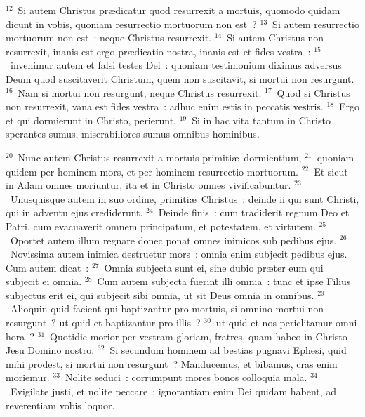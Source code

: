 ${}^{12}$~Si autem Christus pr\ae dicatur quod resurrexit a mortuis, quomodo quidam dicunt in vobis, quoniam resurrectio mortuorum non est~?
${}^{13}$~Si autem resurrectio mortuorum non est~: neque Christus resurrexit.
${}^{14}$~Si autem Christus non resurrexit, inanis est ergo pr\ae dicatio nostra, inanis est et fides vestra~:
${}^{15}$~invenimur autem et falsi testes Dei~: quoniam testimonium diximus adversus Deum quod suscitaverit Christum, quem non suscitavit, si mortui non resurgunt.
${}^{16}$~Nam si mortui non resurgunt, neque Christus resurrexit.
${}^{17}$~Quod si Christus non resurrexit, vana est fides vestra~: adhuc enim estis in peccatis vestris.
${}^{18}$~Ergo et qui dormierunt in Christo, perierunt.
${}^{19}$~Si in hac vita tantum in Christo sperantes sumus, miserabiliores sumus omnibus hominibus.


${}^{20}$~Nunc autem Christus resurrexit a mortuis primiti\ae\ dormientium,
${}^{21}$~quoniam quidem per hominem mors, et per hominem resurrectio mortuorum.
${}^{22}$~Et sicut in Adam omnes moriuntur, ita et in Christo omnes vivificabuntur.
${}^{23}$~Unusquisque autem in suo ordine, primiti\ae\ Christus~: deinde ii qui sunt Christi, qui in adventu ejus crediderunt.
${}^{24}$~Deinde finis~: cum tradiderit regnum Deo et Patri, cum evacuaverit omnem principatum, et potestatem, et virtutem.
${}^{25}$~Oportet autem illum regnare donec ponat omnes inimicos sub pedibus ejus.
${}^{26}$~Novissima autem inimica destruetur mors~: omnia enim subjecit pedibus ejus. Cum autem dicat~:
${}^{27}$~Omnia subjecta sunt ei, sine dubio pr\ae ter eum qui subjecit ei omnia.
${}^{28}$~Cum autem subjecta fuerint illi omnia~: tunc et ipse Filius subjectus erit ei, qui subjecit sibi omnia, ut sit Deus omnia in omnibus.
${}^{29}$~Alioquin quid facient qui baptizantur pro mortuis, si omnino mortui non resurgunt~? ut quid et baptizantur pro illis~?
${}^{30}$~ut quid et nos periclitamur omni hora~?
${}^{31}$~Quotidie morior per vestram gloriam, fratres, quam habeo in Christo Jesu Domino nostro.
${}^{32}$~Si secundum hominem ad bestias pugnavi Ephesi, quid mihi prodest, si mortui non resurgunt~? Manducemus, et bibamus, cras enim moriemur.
${}^{33}$~Nolite seduci~: corrumpunt mores bonos colloquia mala.
${}^{34}$~Evigilate justi, et nolite peccare~: ignorantiam enim Dei quidam habent, ad reverentiam vobis loquor.


